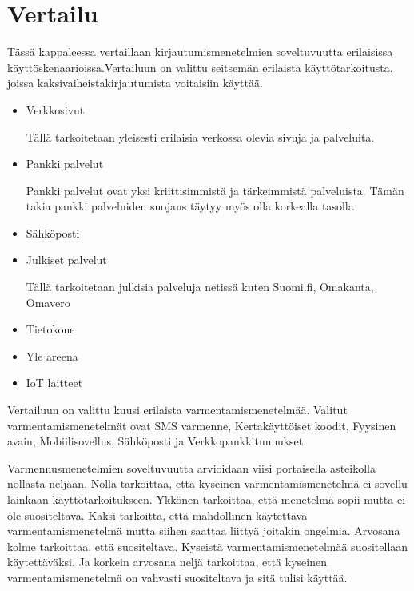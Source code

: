 \chapter{Vertailu\label{vertailu}}

Tässä kappaleessa vertaillaan kirjautumismenetelmien soveltuvuutta erilaisissa käyttöskenaarioissa.Vertailuun on valittu seitsemän erilaista käyttötarkoitusta, joissa kaksivaiheistakirjautumista voitaisiin käyttää.
\begin{itemize}
    \item Verkkosivut
    
    Tällä tarkoitetaan yleisesti erilaisia verkossa olevia sivuja ja palveluita.
    \item Pankki palvelut
    
    Pankki palvelut ovat yksi kriittisimmistä ja tärkeimmistä palveluista. Tämän takia pankki palveluiden suojaus täytyy myös olla korkealla tasolla
    \item Sähköposti
    \item Julkiset palvelut
    
    Tällä tarkoitetaan julkisia palveluja netissä kuten Suomi.fi, Omakanta, Omavero
    \item Tietokone
    \item Yle areena
    \item IoT laitteet
\end{itemize}

Vertailuun on valittu kuusi erilaista varmentamismenetelmää. Valitut varmentamismenetelmät ovat SMS varmenne, Kertakäyttöiset koodit, Fyysinen avain, Mobiilisovellus, Sähköposti ja Verkkopankkitunnukset. 


Varmennusmenetelmien soveltuvuutta arvioidaan viisi portaisella asteikolla nollasta neljään. Nolla tarkoittaa, että kyseinen varmentamismenetelmä ei sovellu lainkaan käyttötarkoitukseen. Ykkönen tarkoittaa, että menetelmä sopii mutta ei ole suositeltava. Kaksi tarkoitta, että mahdollinen käytettävä varmentamismenetelmä mutta siihen saattaa liittyä joitakin ongelmia. Arvosana kolme tarkoittaa, että suositeltava. Kyseistä varmentamismenetelmää suositellaan käytettäväksi. Ja korkein arvosana neljä tarkoittaa, että kyseinen varmentamismenetelmä on vahvasti suositeltava ja sitä tulisi käyttää.


